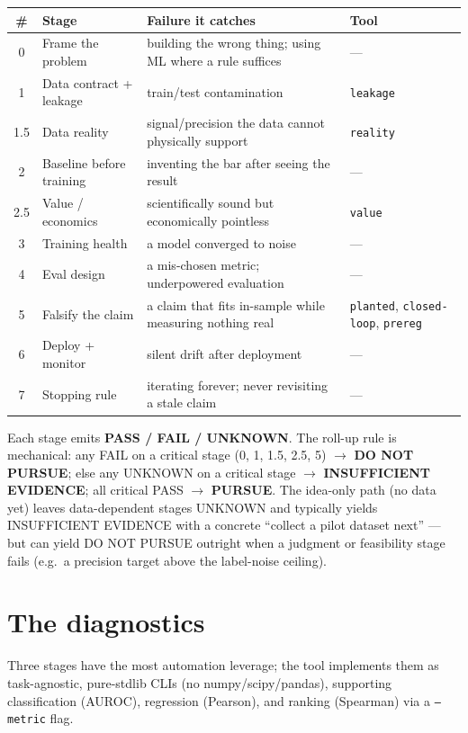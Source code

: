 \documentclass[11pt]{article}
\begin{document}
\begin{center}
\renewcommand{\arraystretch}{1.25}
\small
\begin{tabular}{@{}c l p{5.4cm} p{2.7cm}@{}}
\toprule
\# & Stage & Failure it catches & Tool \\
\midrule
0 & Frame the problem & building the wrong thing; using ML where a rule suffices & --- \\
1 & Data contract + leakage & train/test contamination & \texttt{leakage} \\
1.5 & Data reality & signal/precision the data cannot physically support & \texttt{reality} \\
2 & Baseline before training & inventing the bar after seeing the result & --- \\
2.5 & Value / economics & scientifically sound but economically pointless & \texttt{value} \\
3 & Training health & a model converged to noise & --- \\
4 & Eval design & a mis-chosen metric; underpowered evaluation & --- \\
5 & Falsify the claim & a claim that fits in-sample while measuring nothing real & \texttt{planted}, \texttt{closed-loop}, \texttt{prereg} \\
6 & Deploy + monitor & silent drift after deployment & --- \\
7 & Stopping rule & iterating forever; never revisiting a stale claim & --- \\
\bottomrule
\end{tabular}
\end{center}

Each stage emits \textbf{PASS / FAIL / UNKNOWN}. The roll-up rule is mechanical: any FAIL on a
critical stage (0, 1, 1.5, 2.5, 5) $\rightarrow$ \textbf{DO NOT PURSUE}; else any UNKNOWN on a
critical stage $\rightarrow$ \textbf{INSUFFICIENT EVIDENCE}; all critical PASS $\rightarrow$
\textbf{PURSUE}. The idea-only path (no data yet) leaves data-dependent stages UNKNOWN and typically
yields INSUFFICIENT EVIDENCE with a concrete ``collect a pilot dataset next'' --- but can yield DO NOT
PURSUE outright when a judgment or feasibility stage fails (e.g.\ a precision target above the
label-noise ceiling).

\section{The diagnostics}

Three stages have the most automation leverage; the tool implements them as task-agnostic,
pure-stdlib CLIs (no numpy/scipy/pandas), supporting classification (AUROC), regression (Pearson),
and ranking (Spearman) via a \texttt{--metric} flag.
\end{document}
